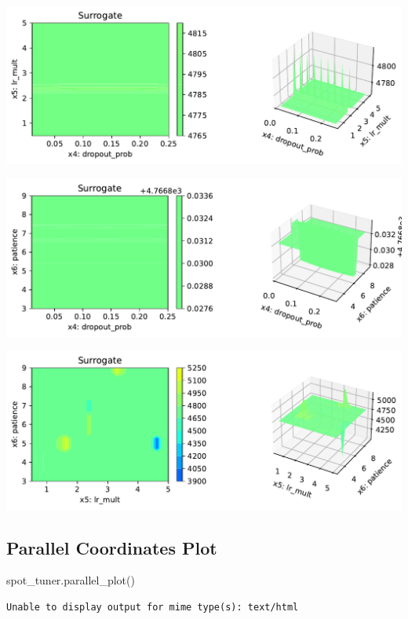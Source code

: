 \documentclass[
  letterpaper,
  DIV=11,
  numbers=noendperiod]{scrreprt}
\newenvironment{Shaded}{\begin{snugshade}}{\end{snugshade}}
\newcommand{\NormalTok}[1]{\textcolor[rgb]{0.00,0.23,0.31}{#1}}
\begin{document}
\includegraphics{032_spot_lightning_rnn_diabetes_files/figure-pdf/cell-21-output-5.pdf}

\includegraphics{032_spot_lightning_rnn_diabetes_files/figure-pdf/cell-21-output-6.pdf}

\includegraphics{032_spot_lightning_rnn_diabetes_files/figure-pdf/cell-21-output-7.pdf}

\subsection{Parallel Coordinates
Plot}\label{parallel-coordinates-plot-1}

\begin{Shaded}
\begin{Highlighting}[]
\NormalTok{spot\_tuner.parallel\_plot()}
\end{Highlighting}
\end{Shaded}

\begin{verbatim}
Unable to display output for mime type(s): text/html
\end{verbatim}
\end{document}
